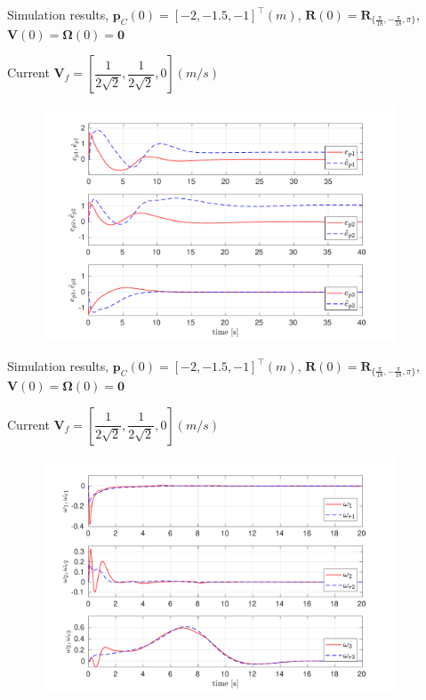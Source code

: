 \documentclass{beamer}
\begin{document}
\begin{frame}{Simulation results, \tiny$\mathbf{p}_C(0) = [-2, -1.5, -1 ]^{\top} (m)$, $\mathbf{R}(0) = \mathbf{R}_{\{\frac{\pi}{18},-\frac{\pi}{18},\pi\}}$, $\mathbf{V}(0) = \mathbf{\Omega}(0) = \mathbf{0}$}

\begin{block}{Current $\mathbf{V}_f = [\dfrac{1}{2\sqrt{2}}, \dfrac{1}{2\sqrt{2}}, 0] (m/s)$}
	\begin{figure}
		\includegraphics[width = 105mm]{Images/Data_avecCurrent_ep_epHat2.pdf}	
	\end{figure}
\end{block}
\end{frame}
\begin{frame}{Simulation results, \tiny$\mathbf{p}_C(0) = [-2, -1.5, -1 ]^{\top} (m)$, $\mathbf{R}(0) = \mathbf{R}_{\{\frac{\pi}{18},-\frac{\pi}{18},\pi\}}$, $\mathbf{V}(0) = \mathbf{\Omega}(0) = \mathbf{0}$}

\begin{block}{Current $\mathbf{V}_f = [\dfrac{1}{2\sqrt{2}}, \dfrac{1}{2\sqrt{2}}, 0] (m/s)$}
	\begin{figure}
		\includegraphics[width = 105mm]{Images/Data_avecCurrent_Om_Omr2.pdf}	
	\end{figure}
\end{block}
\end{frame}
\end{document}
